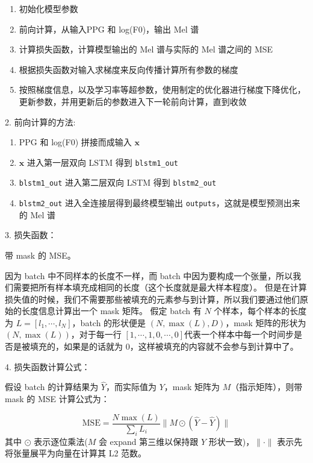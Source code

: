 \documentclass[degree=project,degree-type=project,cjk-font=noto]{thuthesis}
\begin{document}
\begin{enumerate}
	\item 初始化模型参数
	\item 前向计算，从输入PPG 和 log(F0)，输出 Mel 谱
	\item 计算损失函数，计算模型输出的 Mel 谱与实际的 Mel 谱之间的 MSE
	\item 根据损失函数对输入求梯度来反向传播计算所有参数的梯度
	\item 按照梯度信息，以及学习率等超参数，使用制定的优化器进行梯度下降优化，更新参数，并用更新后的参数进入下一轮前向计算，直到收敛
\end{enumerate}

2. 前向计算的方法:

\begin{enumerate}
	\item PPG 和 log(F0) 拼接而成输入 $\bm{x}$
	\item $\bm{x}$ 进入第一层双向 LSTM 得到 \texttt{blstm1\_out}
	\item \texttt{blstm1\_out} 进入第二层双向 LSTM 得到 \texttt{blstm2\_out}
	\item \texttt{blstm2\_out} 进入全连接层得到最终模型输出 \texttt{outputs}，这就是模型预测出来的 Mel 谱
\end{enumerate}

3. 损失函数：

带 mask 的 MSE。

因为 batch 中不同样本的长度不一样，而 batch 中因为要构成一个张量，所以我们需要把所有样本填充成相同的长度（这个长度就是最大样本程度）。
但是在计算损失值的时候，我们不需要那些被填充的元素参与到计算，所以我们要通过他们原始的长度信息计算出一个 mask 矩阵。
假定 batch 有 $N$ 个样本，每个样本的长度为 $L = [l_1, \cdots, l_N]$，batch 的形状便是 $(N, \max(L), D)$，mask 矩阵的形状为 $(N, \max(L))$，对于每一行 $[1, \cdots, 1, 0, \cdots, 0]$代表一个样本中每一个时间步是否是被填充的，如果是的话就为 $0$，这样被填充的内容就不会参与到计算中了。

4. 损失函数计算公式：

假设 batch 的计算结果为 $\hat{Y}$，而实际值为 $Y$，mask 矩阵为 $M$（指示矩阵），则带 mask 的 MSE 计算公式为：

\begin{equation}
	\text{MSE} = \frac{N \max(L)}{\sum_i L_i} \lVert M \odot (\hat{Y} - \hat{Y}) \rVert
\end{equation}
其中 $\odot$ 表示逐位乘法($M$ 会 expand 第三维以保持跟 $Y$ 形状一致)，$\lVert \cdot \rVert$ 表示先将张量展平为向量在计算其 L2 范数。
\end{document}
